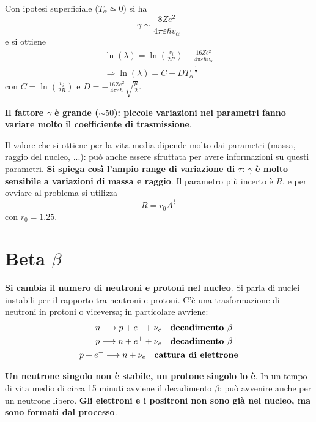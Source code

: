 \documentclass[a4paper,11pt,twoside,openany]{book}
\theoremstyle{definition}
\theoremstyle{plain}
\theoremstyle{plain}
\theoremstyle{definition}
\begin{document}
Con ipotesi superficiale ($T_{\alpha}\simeq 0$) si ha $$\gamma\sim \frac{8Ze^2}{4\pi\varepsilon \hbar v_{\alpha}}$$ e si ottiene
\begin{equation}\begin{split}
\ln{\left(\lambda\right)}=\ln{\left(\frac{v_i}{2R}\right)}-\frac{16Ze^2}{4\pi\varepsilon \hbar v_{\alpha}}\\
\Longrightarrow \ln{\left(\lambda\right)}=C+DT^{-\frac{1}{2}}_{\alpha}
\end{split}\end{equation}
con $C=\ln{\left(\frac{v_i}{2R}\right)}$ e $D=-\frac{16Ze^2}{4\pi\varepsilon \hbar}\sqrt{\frac{\mu}{2}}$.

\textbf{Il fattore $\gamma$ è grande ($\sim 50$): piccole variazioni nei parametri fanno variare molto il coefficiente di trasmissione}.

Il valore che si ottiene per la vita media dipende molto dai parametri (massa, raggio del nucleo, ...): può anche essere sfruttata per avere informazioni su questi parametri. \textbf{Si spiega così l'ampio range di variazione di $\tau$: $\gamma$ è molto sensibile a variazioni di massa e raggio}. Il parametro più incerto è $R$, e per ovviare al problema si utilizza $$R=r_0A^{\frac{1}{5}}$$ con $r_0=1.25$.

\section{Beta $\beta$} %
\textbf{Si cambia il numero di neutroni e protoni nel nucleo}. Si parla di nuclei instabili per il rapporto tra neutroni e protoni. C'è una trasformazione di neutroni in protoni o viceversa; in particolare avviene:
\begin{equation}\begin{split}
n\longrightarrow p+e^-+\bar\nu_e \quad \textrm{\textbf{decadimento }}\beta^-\\
p\longrightarrow n+e^++\nu_e \quad \textrm{\textbf{decadimento }}\beta^+\\
p+e^-\longrightarrow n +\nu_e \quad \textrm{\textbf{cattura di elettrone}}
\end{split}\end{equation}

\textbf{Un neutrone singolo non è stabile, un protone singolo lo è}. In un tempo di vita medio di circa 15 minuti avviene il decadimento $\beta$: può avvenire anche per un neutrone libero. \textbf{Gli elettroni e i positroni non sono già nel nucleo, ma sono formati dal processo}.
\end{document}

